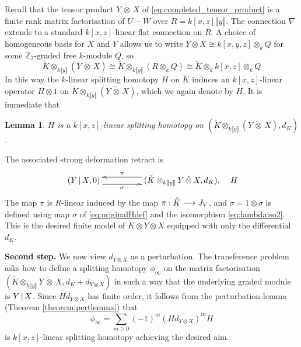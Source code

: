 \documentclass[english,letter paper,12pt,leqno]{article}
\newtheorem{lemma}[theorem]{Lemma}
\theoremstyle{example}
\numberwithin{equation}{section}
\begin{document}
Recall that the tensor product $Y \,\check{\otimes}\, X$ of \eqref{eq:completed_tensor_product} is a finite rank matrix factorisation of $U - W$ over $R = k[x,z]\llbracket y \rrbracket$. The connection $\nabla$ extends to a standard $k[x,z]$-linear flat connection on $R$. A choice of homogeneous basis for $X$ and $Y$ allows us to write $Y \otimes X \cong k[x,y,z] \otimes_k Q$ for some $\mathbb{Z}_2$-graded free $k$-module $Q$, so
\begin{equation}\label{eq:lambdaiso2}
\check{K} \otimes_{k\llbracket y \rrbracket}( Y \,\check{\otimes}\, X ) \cong \check{K} \otimes_{k\llbracket y \rrbracket} (R \otimes_k Q) \cong \check{K} \otimes_k k[x,z] \otimes_k Q
\end{equation}
In this way the $k$-linear splitting homotopy $H$ on $\check{K}$ induces an $k[x,z]$-linear operator $H \otimes 1$ on $\check{K} \otimes_{k\llbracket y \rrbracket}( Y \,\check{\otimes}\, X)$, which we again denote by $H$. It is immediate that

\begin{lemma} $H$ is a $k[x,z]$-linear splitting homotopy on $(\check{K} \otimes_{k\llbracket y \rrbracket} ( Y \,\check{\otimes}\, X ), d_K)$.
\end{lemma}

The associated strong deformation retract is
\[
\xymatrix@C+2pc{
(Y \l X,0) \ar@<-1ex>[r]_-{\sigma} & (\check{K} \otimes_{k\llbracket y \rrbracket} Y \,\check{\otimes}\, X, d_K), \ar@<-1ex>[l]_-{\pi}
} \quad H
\]
The map $\pi$ is $R$-linear induced by the map $\pi: \check{K} \longrightarrow J_V$, and $\sigma = 1 \otimes \sigma$ is defined using map $\sigma$ of \eqref{eq:originalHdef} and the isomorphism \eqref{eq:lambdaiso2}. This is the desired finite model of $K \otimes Y \otimes X$ equipped with only the differential $d_K$. 

\vspace{0.3cm}

\textbf{Second step.} We now view $d_{Y \otimes X}$ as a perturbation. The transference problem asks how to define a splitting homotopy $\phi_\infty$ on the matrix factorisation $(\check{K} \otimes_{k\llbracket y \rrbracket} Y \,\check{\otimes}\, X , d_K + d_{Y \otimes X})$ in such a way that the underlying graded module is $Y \,|\, X$. Since $H d_{Y \otimes X}$ has finite order, it follows from the perturbation lemma (Theorem \ref{theorem:pertlemma}) that
\[
\phi_\infty = \sum_{m \ge 0} (-1)^m (H d_{Y \otimes X})^m H
\]
is $k[x,z]$-linear splitting homotopy achieving the desired aim.
\end{document}
